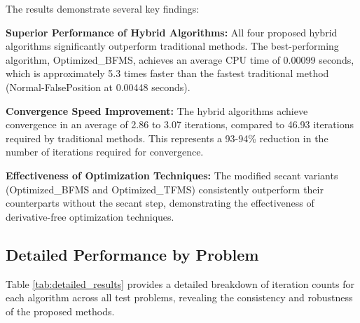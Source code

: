 \documentclass[amsmath, amssymb, aps]{revtex4-2}
\begin{document}
The results demonstrate several key findings:

\textbf{Superior Performance of Hybrid Algorithms:} All four proposed hybrid algorithms significantly outperform traditional methods. The best-performing algorithm, Optimized\_BFMS, achieves an average CPU time of 0.00099 seconds, which is approximately 5.3 times faster than the fastest traditional method (Normal-FalsePosition at 0.00448 seconds).

\textbf{Convergence Speed Improvement:} The hybrid algorithms achieve convergence in an average of 2.86 to 3.07 iterations, compared to 46.93 iterations required by traditional methods. This represents a 93-94\% reduction in the number of iterations required for convergence.

\textbf{Effectiveness of Optimization Techniques:} The modified secant variants (Optimized\_BFMS and Optimized\_TFMS) consistently outperform their counterparts without the secant step, demonstrating the effectiveness of derivative-free optimization techniques.

\subsection{Detailed Performance by Problem}

Table \ref{tab:detailed_results} provides a detailed breakdown of iteration counts for each algorithm across all test problems, revealing the consistency and robustness of the proposed methods.
\end{document}
